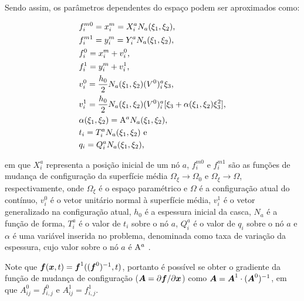 Sendo assim, os parâmetros dependentes do espaço podem ser aproximados como:

\begin{subequations}
    \begin{align}
         & f_i^{m0}=x_i^m=X_i^aN_a(\xi_1,\xi_2)\text{,}                                            \\
         & f_i^{m1}=y_i^m=Y_i^aN_a(\xi_1,\xi_2)\text{,}                                            \\
         & f_i^0=x_i^m+v_i^0\text{,}                                                               \\
         & f_i^1=y_i^m+v_i^1\text{,}                                                               \\
         & v_i^0=\frac{h_0}{2}N_ a(\xi_1,\xi_2)(V^0)_i^a\xi_3\text{,}                              \\
         & v_i^1=\frac{h_0}{2}N_ a(\xi_1,\xi_2)(V^0)_i^a[\xi_3+\alpha(\xi_1,\xi_2)\xi_3^2]\text{,} \\
         & \alpha(\xi_1,\xi_2)=\mathrm{A}^aN_a(\xi_1,\xi_2)\text{,}                                    \\
         & t_i=T_i^aN_a(\xi_1,\xi_2)\text{ e}                                                      \\
         & q_i=Q_i^aN_a(\xi_1,\xi_2)\text{,}
    \end{align}
\end{subequations}

\noindent em que $X_i^a$ representa a posição inicial de um nó $a$, $f_i^{m0}$ e $f_i^{m1}$ são as funções de mudança de configuração da superfície média $\Omega_\xi\to\Omega_0$ e $\Omega_\xi\to\Omega$, respectivamente, onde $\Omega_\xi$ é o espaço paramétrico e $\Omega$ é a configuração atual do contínuo, $v_i^0$ é o vetor unitário normal à superfície média, $v_i^1$ é o vetor generalizado na configuração atual, $h_0$ é a espessura inicial da casca, $N_a$ é a função de forma, $T_i^a$ é o valor de $t_i$ sobre o nó $a$, $Q_i^a$ é o valor de $q_i$ sobre o nó $a$ e $\alpha$ é uma variável inserida no problema, denominada como taxa de variação da espessura, cujo valor sobre o nó $a$ é $\mathrm{A}^a$ \cite{sanches2013unconstrained,sanches2014fluid}.

Note que $\boldsymbol{f}(\boldsymbol{x},t)=\boldsymbol{f}^1((\boldsymbol{f}^0)^{-1},t)$, portanto é possível se obter o gradiente da função de mudança de configuração ($\boldsymbol{A}=\partial\boldsymbol{f}/\partial\boldsymbol{x}$) como $\boldsymbol{A}=\boldsymbol{A}^1\cdot(\boldsymbol{A}^0)^{-1}$, em que $A^0_{ij}=f^0_{i,j}$ e $A^1_{ij}=f^1_{i,j}$.

